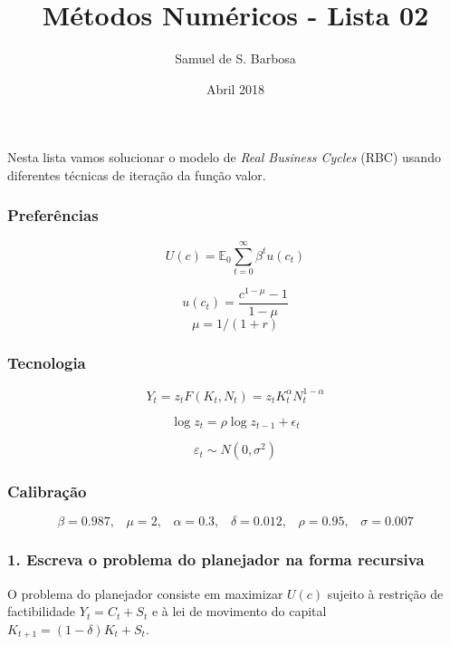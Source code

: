 \documentclass{article}
\title{Métodos Numéricos - Lista 02}
\author{Samuel de S. Barbosa}
\date{Abril 2018}
\begin{document}
\maketitle

\section*{}

Nesta lista vamos solucionar o modelo de \textit{Real Business Cycles} (RBC) usando diferentes
técnicas de iteração da função valor.


\subsubsection*{Preferências}

$$ U(c) = \mathbb{E}_0 \sum_{t=0}^{\infty} \beta^t u(c_t) $$

$$ u(c_t) = \frac{c^{1-\mu}-1}{1-\mu}$$
$$\mu = 1/(1+r)$$

\subsubsection*{Tecnologia}

$$Y_t = z_t F(K_t, N_t) = z_t K_t^\alpha N_t^{1-\alpha}$$

$$ \log z_t = \rho \log z_{t-1} + \epsilon_t $$

$$ \varepsilon_t \sim N(0, \sigma^2) $$

\subsubsection*{Calibração}

$$\beta = 0.987, \,\,\,\,\, \mu=2, \,\,\,\,\,  \alpha=0.3, \,\,\,\,\,  \delta=0.012, \,\,\,\,\,  \rho=0.95, \,\,\,\,\, \sigma=0.007$$

\newpage


\subsubsection*{1. Escreva o problema do planejador na forma recursiva}

O problema do planejador consiste em maximizar $U(c)$ sujeito à restrição de
factibilidade $Y_t = C_t + S_t$ e à lei de movimento do capital 
$K_{t+1} = (1-\delta)K_t + S_t$.
\end{document}
